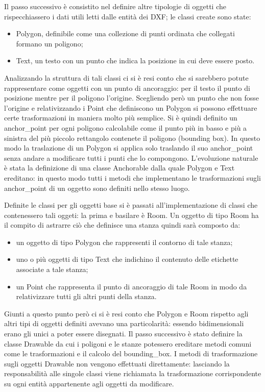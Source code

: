 \documentclass[12pt]{report}
\begin{document}
Il passo successivo è consistito nel definire altre tipologie di oggetti che rispecchiassero i dati utili letti dalle entità dei DXF; le classi create sono state:
\begin{itemize}
\item Polygon, definibile come una collezione di punti ordinata che collegati formano un poligono;
\item Text, un testo con un punto che indica la posizione in cui deve essere posto.
\end{itemize}

Analizzando la struttura di tali classi ci si è resi conto che si sarebbero potute rappresentare come oggetti con un punto di ancoraggio: per il testo il punto di posizione mentre per il poligono l'origine. 
Scegliendo però un punto che non fosse l'origine e relativizzando i Point che definiscono un Polygon si possono effettuare certe trasformazioni in maniera molto più semplice. Si è quindi definito un anchor\_point per ogni poligono calcolabile come il punto più in basso e più a sinistra del più piccolo rettangolo contenete il poligono (bounding box). 
In questo modo la traslazione di un Polygon si applica solo traslando il suo anchor\_point senza andare a modificare tutti i punti che lo compongono. 
L'evoluzione naturale è stata la definizione di una classe Anchorable dalla quale Polygon e Text ereditano: in questo modo tutti i metodi che implementano le trasformazioni sugli anchor\_point di un oggetto sono definiti nello stesso luogo.

Definite le classi per gli oggetti base si è passati all'implementazione di classi che contenessero tali oggeti: la prima e basilare è Room.
Un oggetto di tipo Room ha il compito di astrarre ciò che definisce una stanza quindi sarà composto da:
\begin{itemize}
\item un oggetto di tipo Polygon che rappresenti il contorno di tale stanza;
\item uno o più oggetti di tipo Text che indichino il contenuto delle etichette associate a tale stanza;
\item un Point che rappresenta il punto di ancoraggio di tale Room in modo da relativizzare tutti gli altri punti della stanza.
\end{itemize}

Giunti a questo punto però ci si è resi conto che Polygon e Room rispetto agli altri tipi di oggetti definiti avevano una particolarità: essendo bidimensionali erano gli unici a poter essere disegnati.
Il passo successivo è stato definire la classe Drawable da cui i poligoni e le stanze potessero ereditare metodi comuni come le trasformazioni e il calcolo del bounding\_box.
I metodi di trasformazione sugli oggetti Drawable non vengono effettuati direttamente: lasciando la responsabilità alle singole classi viene richiamata la trasformazione corrispondente su ogni entità appartenente agli oggetti da modificare.
\end{document}
